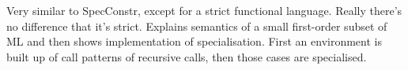 Very similar to SpecConstr, except for a strict functional language.
Really there's no difference that it's strict.
Explains semantics of a small first-order subset of ML and then shows implementation of specialisation.
First an environment is built up of call patterns of recursive calls, then those cases are specialised.


